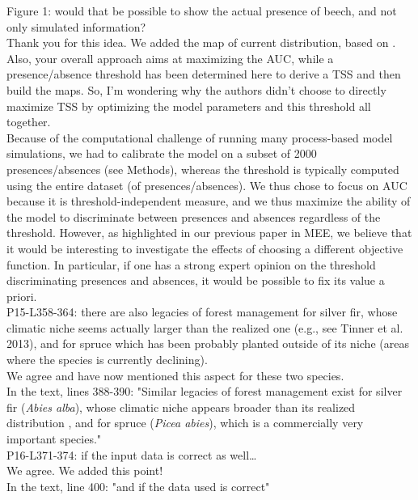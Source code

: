 \documentclass[a4paper, 11pt]{article}
\begin{document}
\noindent Figure 1: would that be possible to show the actual presence of beech, and not only simulated information? \\
\textcolor{customblue}{Thank you for this idea. We added the map of current distribution, based on \citet{Caudullo2017}.}\\

\noindent Also, your overall approach aims at maximizing the AUC, while a presence/absence threshold has been determined here to derive a TSS and then build the maps. So, I'm wondering why the authors didn't choose to directly maximize TSS by optimizing the model parameters and this threshold all together.\\
\textcolor{customblue}{Because of the computational challenge of running many process-based model simulations, we had to calibrate the model on a subset of 2000 presences/absences (see Methods), whereas the threshold is typically computed using the entire dataset (of presences/absences). We thus chose to focus on AUC because it is threshold-independent measure, and we thus maximize the ability of the model to discriminate between presences and absences regardless of the threshold. However, as highlighted in our previous paper in MEE, we believe that it would be interesting to investigate the effects of choosing a different objective function. In particular, if one has a strong expert opinion on the threshold discriminating presences and absences, it would be possible to fix its value a priori.}\\

\noindent P15-L358-364: there are also legacies of forest management for silver fir, whose climatic niche seems actually larger than the realized one (e.g., see Tinner et al. 2013), and for spruce which has been probably planted outside of its niche (areas where the species is currently declining).\\
\textcolor{customblue}{We agree and have now mentioned this aspect for these two species.}\\
In the text, lines 388-390: \textcolor{customred}{"Similar legacies of forest management exist for silver fir (\emph{Abies alba}), whose climatic niche appears broader than its realized distribution \citep{Tinner2013}, and for spruce (\emph{Picea abies}),  which is a commercially very important species."}\\ 

\noindent P16-L371-374: if the input data is correct as well…\\
\textcolor{customblue}{We agree. We added this point!}\\
In the text, line 400: \textcolor{customred}{"and if the data used is correct"}\\ 
\end{document}
